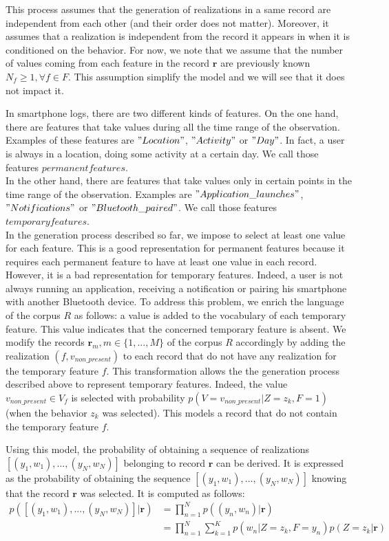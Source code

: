 This process assumes that the generation of realizations in a same record are independent from each other (and their order does not matter). Moreover, it assumes that a realization is independent from the record it appears in when it is conditioned on the behavior. For now, we note that we assume that the number of values coming from each feature in the record $\mathbf{r}$ are previously known $N_{f}\geq 1,\forall f\in F$. This assumption simplify the model and we will see that it does not impact it. \par

In smartphone logs, there are two different kinds of features. On the one hand, there are features that take values during all the time range of the observation. Examples of these features are $"Location"$, $"Activity"$ or $"Day"$. In fact, a user is always in a location, doing some activity at a certain day. We call those features $permanent features$.
\\In the other hand, there are features that take values only in certain points in the time range of the observation. Examples are $"Application\_launches"$, $"Notifications"$ or $"Bluetooth\_paired"$. We call those features $temporary features$.
\\In the generation process described so far, we impose to select at least one value for each feature. This is a good representation for permanent features because it requires each permanent feature to have at least one value in each record. However, it is a bad representation for temporary features. Indeed, a user is not always running an application, receiving a notification or pairing his smartphone with another Bluetooth device. To address this problem, we enrich the language of the corpus $R$ as follows: a value is added to the vocabulary of each temporary feature. This value indicates that the concerned temporary feature is absent. We modify the records $\mathbf{r}_{m}, m\in\{1,...,M\}$ of the corpus $R$ accordingly by adding the realization $(f, v_{non\_present})$ to each record that do not have any realization for the temporary feature $f$. This transformation allows the the generation process described above to represent temporary features. Indeed, the value $v_{non\_present} \in V_{f}$ is selected with probability $p(V=v_{non\_present}|Z=z_{k},F=1)$ (when the behavior $z_{k}$ was selected). This models a record that do not contain the temporary feature $f$. \par

Using this model, the probability of obtaining a sequence of realizations $[(y_{1},w_{1}),...,(y_{N},w_{N})]$ belonging to record $\mathbf{r}$ can be derived. It is expressed as the probability of obtaining the sequence $[(y_{1},w_{1}),...,(y_{N},w_{N})]$ knowing that the record $\mathbf{r}$ was selected. It is computed as follows:
\begin{equation} \label{eqhcmmdt1}
\begin{aligned}
p([(y_{1},w_{1}),...,(y_{N},w_{N})]|\mathbf{r})&=\prod_{n=1}^{N}p((y_{n},w_{n})|\mathbf{r})\\
&=\prod_{n=1}^{N}\sum_{k=1}^{K}p(w_{n}|Z=z_{k}, F=y_{n})p(Z=z_{k}|\mathbf{r})
\end{aligned}
\end{equation}

